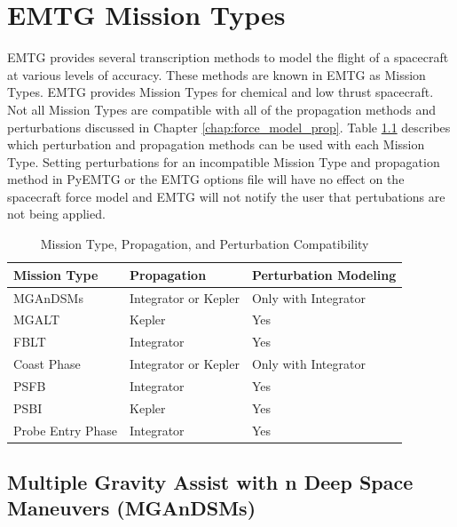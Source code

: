 \chapter{EMTG Mission Types}
\label{chap:mission_types}

    \ac{EMTG} provides several transcription methods to model the flight of a spacecraft at various levels of accuracy. These methods are known in \ac{EMTG} as Mission Types. \ac{EMTG} provides Mission Types for chemical and low thrust spacecraft. Not all Mission Types are compatible with all of the propagation methods and perturbations discussed in Chapter \ref{chap:force_model_prop}. Table \ref{tab:mission_propagation_perturbation_compatibility} describes which perturbation and propagation methods can be used with each Mission Type. Setting perturbations for an incompatible Mission Type and propagation method in PyEMTG or the \ac{EMTG} options file will have no effect on the spacecraft force model and \ac{EMTG} will not notify the user that pertubations are not being applied.

    \begin{table}[H]
        \centering
        \begin{tabular}{lll}
        \hline
        Mission Type & Propagation & Perturbation Modeling \\ \hline
        \ac{MGAnDSMs} & Integrator or Kepler & Only with Integrator \\
        \ac{MGALT} & Kepler & Yes \\
        \ac{FBLT} & Integrator & Yes \\
        Coast Phase & Integrator or Kepler & Only with Integrator \\ 
        \ac{PSFB} & Integrator & Yes \\
        \ac{PSBI} & Kepler & Yes \\
        Probe Entry Phase & Integrator & Yes \\
        \hline
        \end{tabular}
        \caption{Mission Type, Propagation, and Perturbation Compatibility}
        \label{tab:mission_propagation_perturbation_compatibility}
    \end{table}


\section{Multiple Gravity Assist with n Deep Space Maneuvers (MGAnDSMs)}
\label{sec:MGAnDSMs}

